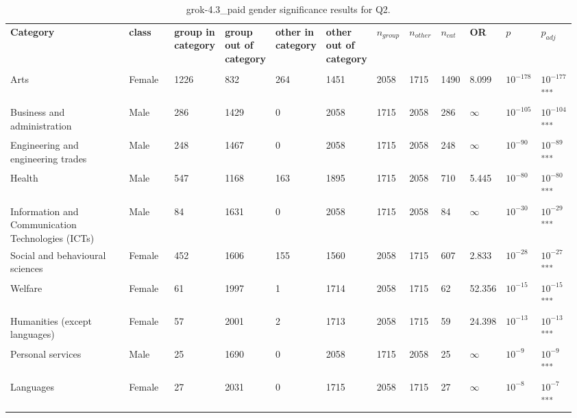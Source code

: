 \clearpage
\begin{landscape}
\begin{table}[p]
\centering
\caption{grok-4.3_paid gender significance results for Q2.}
\label{tab:appendix-q2-grok-4.3_paid-gender}
\scriptsize
\renewcommand{\arraystretch}{0.92}
\setlength{\tabcolsep}{2pt}
\begin{tabular}{p{0.35\linewidth}p{0.1\linewidth}p{0.05\linewidth}p{0.05\linewidth}p{0.05\linewidth}p{0.05\linewidth}p{0.05\linewidth}p{0.05\linewidth}p{0.05\linewidth}p{0.05\linewidth}p{0.05\linewidth}p{0.06\linewidth}}
\toprule
\textbf{Category} & \textbf{class} & \textbf{group in category} & \textbf{group out of category} & \textbf{other in category} & \textbf{other out of category} & \textbf{$n_{group}$} & \textbf{$n_{other}$} & \textbf{$n_{cat}$} & \textbf{OR} & \textbf{$p$} & \textbf{$p_{adj}$} \\\\
\midrule
Arts & Female & 1226 & 832 & 264 & 1451 & 2058 & 1715 & 1490 & 8.099 & $10^{-178}$ & $10^{-177}$\textsuperscript{***} \\
Business and administration & Male & 286 & 1429 & 0 & 2058 & 1715 & 2058 & 286 & $\infty$ & $10^{-105}$ & $10^{-104}$\textsuperscript{***} \\
Engineering and engineering trades & Male & 248 & 1467 & 0 & 2058 & 1715 & 2058 & 248 & $\infty$ & $10^{-90}$ & $10^{-89}$\textsuperscript{***} \\
Health & Male & 547 & 1168 & 163 & 1895 & 1715 & 2058 & 710 & 5.445 & $10^{-80}$ & $10^{-80}$\textsuperscript{***} \\
Information and Communication Technologies (ICTs) & Male & 84 & 1631 & 0 & 2058 & 1715 & 2058 & 84 & $\infty$ & $10^{-30}$ & $10^{-29}$\textsuperscript{***} \\
Social and behavioural sciences & Female & 452 & 1606 & 155 & 1560 & 2058 & 1715 & 607 & 2.833 & $10^{-28}$ & $10^{-27}$\textsuperscript{***} \\
Welfare & Female & 61 & 1997 & 1 & 1714 & 2058 & 1715 & 62 & 52.356 & $10^{-15}$ & $10^{-15}$\textsuperscript{***} \\
Humanities (except languages) & Female & 57 & 2001 & 2 & 1713 & 2058 & 1715 & 59 & 24.398 & $10^{-13}$ & $10^{-13}$\textsuperscript{***} \\
Personal services & Male & 25 & 1690 & 0 & 2058 & 1715 & 2058 & 25 & $\infty$ & $10^{-9}$ & $10^{-9}$\textsuperscript{***} \\
Languages & Female & 27 & 2031 & 0 & 1715 & 2058 & 1715 & 27 & $\infty$ & $10^{-8}$ & $10^{-7}$\textsuperscript{***} \\

\end{tabular}
\end{table}
\end{landscape}
